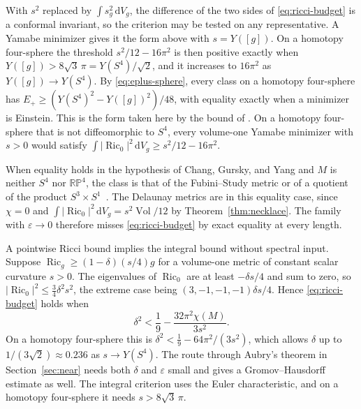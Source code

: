 \documentclass[11pt]{article}
\numberwithin{equation}{section}
\DeclareMathOperator{\Ric}{Ric}
\DeclareMathOperator{\Vol}{Vol}
\newcommand{\dd}{\mathrm{d}}
\newcommand{\e}{\varepsilon}
\newcommand{\Sphere}{S^4}
\newcommand{\abs}[1]{\lvert #1\rvert}
\newcommand{\dv}{\dd V_g}
\newcommand{\Y}{Y([g])}
\begin{document}
With \(s^2\) replaced by \(\int s_g^2\,\dv\), the difference of the two
sides of \eqref{eq:ricci-budget} is a conformal invariant, so the
criterion may be tested on any representative. A Yamabe minimizer
gives it the form above with \(s=\Y\). On a homotopy four-sphere the
threshold \(s^2/12-16\pi^2\) is then positive exactly when
\(\Y>8\sqrt3\,\pi=Y(\Sphere)/\sqrt2\), and it increases to
\(16\pi^2\) as \(\Y\to Y(\Sphere)\). By \eqref{eq:eplus-sphere}, every
class on a homotopy four-sphere has
\(E_+\ge(Y(\Sphere)^2-\Y^2)/48\), with equality exactly when a
minimizer is Einstein. This is the form taken here by the bound of
\cite[Eq.~(1.7)]{ChangQingYang2006Gap}. On a homotopy four-sphere that
is not diffeomorphic to \(\Sphere\), every volume-one Yamabe minimizer
with \(s>0\) would satisfy
\(\int\abs{\Ric_0}^2\,\dv\ge s^2/12-16\pi^2\).

When equality holds in the hypothesis of Chang, Gursky, and Yang and
\(M\) is neither \(\Sphere\) nor \(\mathbb{RP}^4\), the class is that
of the Fubini--Study metric or of a quotient of the product
\(S^3\times S^1\)~\cite[Theorem~1.1]{ChangQingYang2006Gap}. The
Delaunay metrics are in this equality case, since \(\chi=0\) and
\(\int\abs{\Ric_0}^2\,\dv=s^2\Vol/12\) by Theorem~\ref{thm:necklace}.
The family with \(\e\to0\) therefore misses \eqref{eq:ricci-budget} by
exact equality at every length.

A pointwise Ricci bound implies the integral bound without spectral
input. Suppose \(\Ric_g\ge(1-\delta)(s/4)g\) for a volume-one metric
of constant scalar curvature \(s>0\). The eigenvalues of \(\Ric_0\)
are at least \(-\delta s/4\) and sum to zero, so
\(\abs{\Ric_0}^2\le\tfrac34\delta^2s^2\), the extreme case being
\((3,-1,-1,-1)\delta s/4\). Hence \eqref{eq:ricci-budget} holds when
\[
 \delta^2<\frac19-\frac{32\pi^2\chi(M)}{3s^2}.
\]
On a homotopy four-sphere this is
\(\delta^2<\tfrac19-64\pi^2/(3s^2)\), which allows \(\delta\) up to
\(1/(3\sqrt2)\approx0.236\) as \(s\to Y(\Sphere)\). The route through
Aubry's theorem in Section~\ref{sec:near} needs both \(\delta\) and
\(\e\) small and gives a Gromov--Hausdorff estimate as well. The
integral criterion uses the Euler characteristic, and on a homotopy
four-sphere it needs \(s>8\sqrt3\,\pi\).
\end{document}
